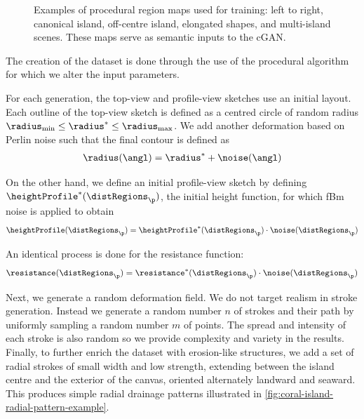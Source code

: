 \begin{figure}
    \caption{Examples of procedural region maps used for training: left to right, canonical island, off-centre island, elongated shapes, and multi-island scenes. These maps serve as semantic inputs to the cGAN.}
    \label{fig:coral-island-difficulties-dataset}
\end{figure}

The creation of the dataset is done through the use of the procedural algorithm for which we alter the input parameters.

For each generation, the top-view and profile-view sketches use an initial layout. Each outline of the top-view sketch is defined as a centred circle of random radius $\radius_\text{min} \leq \radius^* \leq \radius_\text{max}$. We add another deformation based on Perlin noise such that the final contour is defined as
\begin{align}
    \radius(\angl) = \radius^* + \noise(\angl)
\end{align}

On the other hand, we define an initial profile-view sketch by defining $\heightProfile^*(\distRegions_\p)$, the initial height function, for which fBm noise is applied to obtain
\begin{align}
    \heightProfile(\distRegions_\p) = \heightProfile^*(\distRegions_\p) \cdot \noise(\distRegions_\p)
\end{align}

An identical process is done for the resistance function:
\begin{align}
    \resistance(\distRegions_\p) = \resistance^*(\distRegions_\p) \cdot \noise(\distRegions_\p)
\end{align}

Next, we generate a random deformation field. We do not target realism in stroke generation. Instead we generate a random number $n$ of strokes and their path by uniformly sampling a random number $m$ of points. The spread and intensity of each stroke is also random so we provide complexity and variety in the results.
Finally, to further enrich the dataset with erosion-like structures, we add a set of radial strokes of small width and low strength, extending between the island centre and the exterior of the canvas, oriented alternately landward and seaward. This produces simple radial drainage patterns illustrated in \cref{fig:coral-island-radial-pattern-example}.

